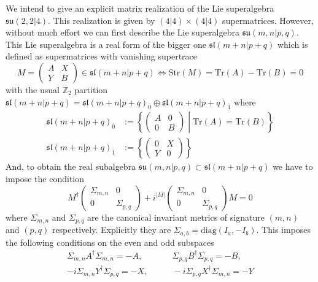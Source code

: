 \documentclass[a4paper,12pt]{article}
\numberwithin{equation}{section}
\numberwithin{thm}{section}
\numberwithin{exm}{section}
\newcommand{\tr}{\mathrm{Tr}}
\newcommand{\str}{\mathrm{Str}}
\newcommand{\Z}{{\mathbb Z}}
\newcommand{\<}{{\langle}}
\renewcommand{\>}{{\rangle}}
\newcommand{\mf}{\mathfrak}
\newcommand{\dg}{\dagger}
\renewcommand{\S}{{\Sigma}}
\begin{document}
We intend to give an explicit matrix realization of the Lie superalgebra $\mf{su}(2,2|4)$. This realization is given by $(4|4)\times(4|4)$ supermatrices. However, without much effort we can first describe the Lie superalgebra $\mf{su}(m,n|p,q)$. This Lie superalgebra is a real form of the bigger one $\mf{sl}(m+n|p+q)$ which is defined as supermatrices with vanishing supertrace
	\begin{equation}
	M = \left(
		\begin{array}{cc}
		A & X \\
		Y & B
		\end{array}
	\right) \in \mf{sl}(m+n|p+q) \Leftrightarrow \str(M) = \tr(A) - \tr(B) = 0
	\end{equation}
with the usual $\Z_2$ partition $\mf{sl}(m+n|p+q) = \mf{sl}(m+n|p+q)_{\bar 0} \oplus \mf{sl}(m+n|p+q)_{\bar 1}$ where
	\begin{align}
	\mf{sl}(m+n|p+q)_{\bar 0} & := \left\{ \left(
		\begin{array}{cc}
		A & 0 \\
		0 & B
		\end{array}
	\right)\middle| \tr(A) = \tr(B)\right\} \\
	\mf{sl}(m+n|p+q)_{\bar 1} & := \left\{ \left(
		\begin{array}{cc}
		0 & X \\
		Y & 0
		\end{array}
	\right)\right\}
	\end{align}
And, to obtain the real subalgebra $\mf{su}(m,n|p,q)\subset \mf{sl}(m+n|p+q)$ we have to impose the condition
	\begin{equation}\label{sucond}
	M^\dg \left(
		\begin{array}{cc}
		\S_{m,n} & 0 \\
		0 & \S_{p,q}
		\end{array}
	\right) + i^{|M|} \left(
		\begin{array}{cc}
		\S_{m,n} & 0 \\
		0 & \S_{p,q}
		\end{array}
	\right) M = 0
	\end{equation}
where $\S_{m,n}$ and $\S_{p,q}$ are the canonical invariant metrics of signature $(m,n)$ and $(p,q)$ respectively. Explicitly they are $\S_{a,b} = \text{diag}(I_a, -I_b)$. This imposes the following conditions on the even and odd subspaces
	\begin{align}
	\S_{m,n}A^\dg \S_{m,n} = -A, &\qquad \S_{p,q}B^\dg \S_{p,q} = - B, \\
	-i\S_{m,n} Y^\dg \S_{p,q} = -X, &\qquad -i\S_{p,q} X^\dg \S_{m,n} = -Y
	\end{align}
\end{document}
